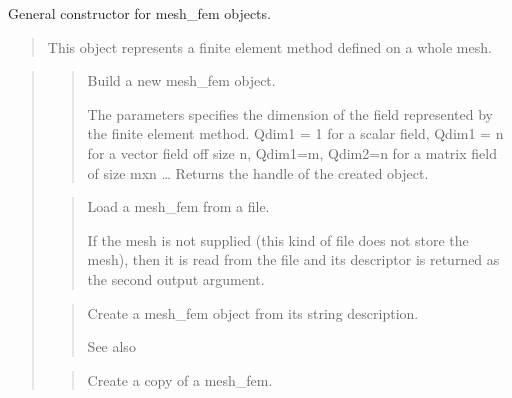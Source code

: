 \documentclass[a4paper,11pt,english]{sphinxmanual}
\begin{document}

General constructor for mesh\_fem objects.
\begin{quote}

This object represents a finite element method defined on a whole mesh.
\end{quote}

\begin{quote}

\begin{quote}

Build a new mesh\_fem object.

The  parameters specifies the dimension of the field represented
by the finite element method. Qdim1 = 1 for a scalar field,
Qdim1 = n for a vector field off size n, Qdim1=m, Qdim2=n for
a matrix field of size mxn …
Returns the handle of the created object.
\end{quote}

\begin{quote}

Load a mesh\_fem from a file.

If the mesh  is not supplied (this kind of file does not store the
mesh), then it is read from the file  and its descriptor is
returned as the second output argument.
\end{quote}

\begin{quote}

Create a mesh\_fem object from its string description.

See also 
\end{quote}

\begin{quote}

Create a copy of a mesh\_fem.
\end{quote}

\begin{quote}


\end{quote}
\end{quote}
\end{document}
